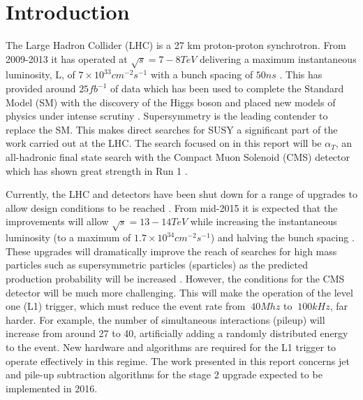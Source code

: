 
\chapter{Introduction} %

\label{Chapter1} %


The Large Hadron Collider (LHC) is a 27 km proton-proton synchrotron. From 2009-2013 it has operated at $\sqrt{s}=7-8TeV$ delivering a maximum instantaneous luminosity, L, of $7 \times 10^{33} cm^{-2}s^{-1}$ with a bunch spacing of $50ns$ \cite{run1}. This has provided around $25fb^{-1}$ of data which has been used to complete the Standard Model (SM) with the discovery of the Higgs boson and placed new models of physics under intense scrutiny \cite{cmshiggs}\cite{atlashiggs}\cite{susyr1}. Supersymmetry is the leading contender to replace the SM. This makes direct searches for SUSY a significant part of the work carried out at the LHC. The search focused on in this report will be $\alpha_T$, an all-hadronic final state search with the Compact Muon Solenoid (CMS) detector which has shown great strength in Run 1 \cite{search}. 

Currently, the LHC and detectors have been shut down for a range of upgrades to allow design conditions to be reached \cite{ls1}. From mid-2015 it is expected that the improvements will allow $\sqrt{s}=13-14TeV$ while increasing the instantaneous luminosity (to a maximum of $1.7\times10^34cm^{-2}s^{-1}$) and halving the bunch spacing \cite{HighLumi}. These upgrades will dramatically improve the reach of searches for high mass particles such as supersymmetric particles (sparticles) as the predicted production probability will be increased \cite{ProjectedCx} . However, the conditions for the CMS detector will be much more challenging.  This will make the operation of the level one (L1) trigger, which must reduce the event rate from $~40Mhz$ to $~100kHz$, far harder. For example, the number of simultaneous interactions (pileup) will increase from around 27 to 40, artificially adding a randomly distributed energy to the event. New hardware and algorithms are required for the L1 trigger to operate effectively in this regime. The work presented in this report concerns jet and pile-up subtraction algorithms for the stage 2 upgrade expected to be implemented in 2016.  










